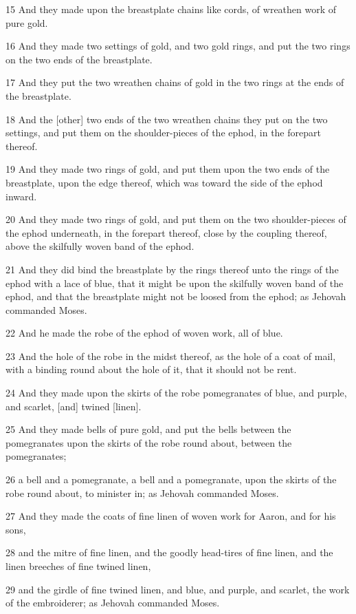 \par 15 And they made upon the breastplate chains like cords, of wreathen work of pure gold.
\par 16 And they made two settings of gold, and two gold rings, and put the two rings on the two ends of the breastplate.
\par 17 And they put the two wreathen chains of gold in the two rings at the ends of the breastplate.
\par 18 And the [other] two ends of the two wreathen chains they put on the two settings, and put them on the shoulder-pieces of the ephod, in the forepart thereof.
\par 19 And they made two rings of gold, and put them upon the two ends of the breastplate, upon the edge thereof, which was toward the side of the ephod inward.
\par 20 And they made two rings of gold, and put them on the two shoulder-pieces of the ephod underneath, in the forepart thereof, close by the coupling thereof, above the skilfully woven band of the ephod.
\par 21 And they did bind the breastplate by the rings thereof unto the rings of the ephod with a lace of blue, that it might be upon the skilfully woven band of the ephod, and that the breastplate might not be loosed from the ephod; as Jehovah commanded Moses.
\par 22 And he made the robe of the ephod of woven work, all of blue.
\par 23 And the hole of the robe in the midst thereof, as the hole of a coat of mail, with a binding round about the hole of it, that it should not be rent.
\par 24 And they made upon the skirts of the robe pomegranates of blue, and purple, and scarlet, [and] twined [linen].
\par 25 And they made bells of pure gold, and put the bells between the pomegranates upon the skirts of the robe round about, between the pomegranates;
\par 26 a bell and a pomegranate, a bell and a pomegranate, upon the skirts of the robe round about, to minister in; as Jehovah commanded Moses.
\par 27 And they made the coats of fine linen of woven work for Aaron, and for his sons,
\par 28 and the mitre of fine linen, and the goodly head-tires of fine linen, and the linen breeches of fine twined linen,
\par 29 and the girdle of fine twined linen, and blue, and purple, and scarlet, the work of the embroiderer; as Jehovah commanded Moses.
